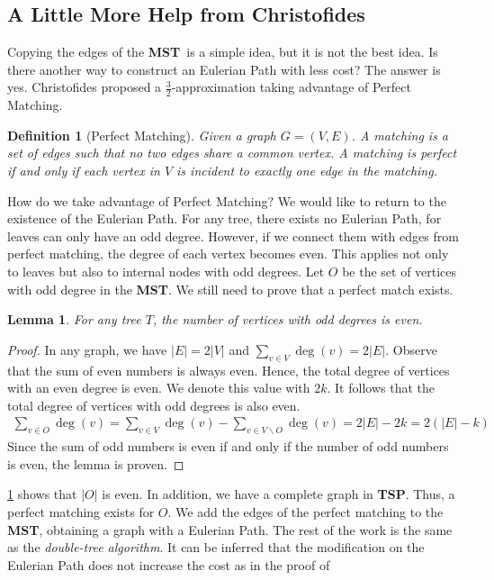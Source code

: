 \documentclass[11pt,psfig,times]{article}
\newcommand*{\mst}{\textbf{MST}}
\newcommand*{\tsp}{\textbf{TSP}}
\newtheorem{lemma}[theorem]{Lemma}
\newtheorem{definition}[theorem]{Definition}
\begin{document}
\subsection{A Little More Help from Christofides}
Copying the edges of the \mst\ is a simple idea, but it is not the best idea. Is there another way to 
construct an Eulerian Path with less cost? The answer is yes. Christofides proposed a $\frac{3}{2}$-approximation 
taking advantage of Perfect Matching.
\begin{definition}[Perfect Matching]
    Given a graph $G = (V, E)$. A matching is a set of edges such that no two edges share a common vertex.
    A matching is perfect if and only if each vertex in $V$ is incident to exactly one edge in the matching.
\end{definition}
How do we take advantage of Perfect Matching? We would like to return to the existence of the Eulerian Path. 
For any tree, there exists no Eulerian Path, for leaves can only have an odd degree. However, if we connect 
them with edges from perfect matching, the degree of each vertex becomes even. This applies not only to 
leaves but also to internal nodes with odd degrees. Let $O$ be the set of vertices with odd degree in the \mst.
We still need to prove that a perfect match exists. 
\begin{lemma}
    \label{lemma:odd}
    For any tree $T$, the number of vertices with odd degrees is even.
\end{lemma}
\begin{proof}
    In any graph, we have $|E| = 2|V|$ and $\sum_{v \in V} \deg(v) = 2|E|$. Observe that the sum of even numbers 
    is always even. Hence, the total degree of vertices with an even degree is even. We denote this value with $2k$.
    It follows that the total degree of vertices with odd degrees is also even.
    \begin{align*}
        \sum_{v \in O} \deg(v) = \sum_{v \in V} \deg(v) - \sum_{v \in V \backslash O} \deg(v) = 2|E| - 2k = 2(|E| - k)
    \end{align*}
    Since the sum of odd numbers is even if and only if the number of odd numbers is even, the lemma is proven.
\end{proof}
\cref{lemma:odd} shows that $|O|$ is even. In addition, we have a complete graph in \tsp. Thus,  
a perfect matching exists for $O$. We add the edges of the perfect matching to the \mst, obtaining a graph with a 
Eulerian Path. The rest of the work is the same as the \textit{double-tree algorithm}. 
It can be inferred that the modification on the Eulerian Path does not increase the cost as in the proof of 
\end{document}

